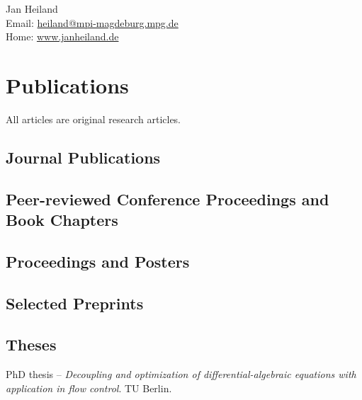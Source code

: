 \documentclass[11pt, a4paper]{article} %
\newcommand{\years}[1]{\marginnote{\scriptsize #1}} %
\begin{document}
\sffamily

{\LARGE Jan Heiland}\\[1cm] %
Email: \href{mailto:heiland@mpi-magdeburg.mpg.de}{heiland@mpi-magdeburg.mpg.de}\\ %
Home: \href{http://www.janheiland.de}{www.janheiland.de}\\[.3in] %



\section*{Publications}

All articles are original research articles.
\vspace{.1in}
\subsection*{Journal Publications}


\vspace{.1in}
\subsection*{Peer-reviewed Conference Proceedings and Book Chapters}


\vspace{.1in}
\subsection*{Proceedings and Posters}


\newpage
\subsection*{Selected Preprints}


\newpage
\vspace{.1in}
\subsection*{Theses}
\years{2014} PhD thesis -- \emph{Decoupling and optimization of differential-algebraic equations with application in flow control}. TU Berlin.\\
\end{document}
